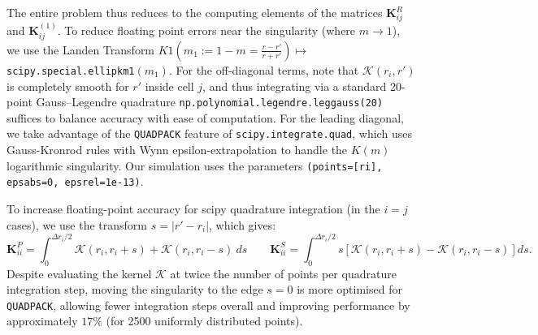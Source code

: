 \documentclass[11pt,a4paper]{article}
\begin{document}
	
	The entire problem thus reduces to the computing elements of the matrices $\mathbf{K}^R_{ij}$ and $\mathbf{K}^{(1)}_{ij}$. To reduce floating point errors near the singularity (where $m \to 1$), we use the Landen Transform  $K1\left(m_1 := 1 - m = \frac{r - r'}{r + r'}\right) \mapsto$ \texttt{scipy.special.ellipkm1$(m_1)$}. For the off-diagonal terms, note that $\mathcal{K}(r_i, r')$ is completely smooth for $r'$ inside cell $j$, and thus integrating via a standard 20-point Gauss–Legendre quadrature \texttt{np.polynomial.legendre.leggauss(20)} suffices to balance accuracy with ease of computation. For the leading diagonal, we take advantage of the \texttt{QUADPACK} feature of \texttt{scipy.integrate.quad}, which uses Gauss-Kronrod rules with Wynn epsilon-extrapolation to handle the $K(m)$ logarithmic singularity. Our simulation uses the parameters \texttt{(points=[ri], epsabs=0, epsrel=1e-13)}.
	
	To increase floating-point accuracy for scipy quadrature integration (in the $i = j$ cases), we use the transform $s = |r' - r_i|$, which gives:
	$$\mathbf{K}^P_{ii} = \int^{\Delta r_i / 2}_0 \mathcal{K}(r_i, r_i + s) + \mathcal{K}(r_i, r_i - s)\ ds \qquad \mathbf{K}^S_{ii} = \int^{\Delta r_i / 2}_0 s \left[\mathcal{K}(r_i, r_i + s) - \mathcal{K}(r_i, r_i - s)\right] ds.$$
	Despite evaluating the kernel $\mathcal{K}$ at twice the number of points per quadrature integration step, moving the singularity to the edge $s = 0$ is more optimised for \texttt{QUADPACK}, allowing fewer integration steps overall and improving performance by approximately $17\%$ (for 2500 uniformly distributed points).
	
	
	
\end{document}
